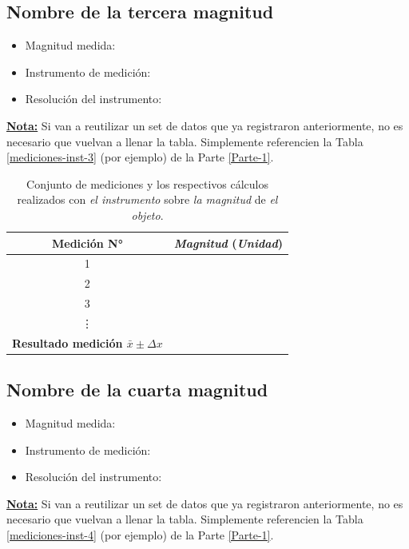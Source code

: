 \documentclass[12pt,a4paper]{article}
\begin{document}
\subsection{Nombre de la tercera magnitud}

\begin{itemize}
    \item Magnitud medida:
    \item Instrumento de medición:
    \item Resolución del instrumento:
\end{itemize}

\underline{\textbf{Nota:}} Si van a reutilizar un set de datos que ya registraron anteriormente, no es necesario que vuelvan a llenar la tabla. Simplemente referencien la Tabla \ref{mediciones-inst-3} (por ejemplo) de la Parte \ref{Parte-1}.

\begin{table}[h!]
\centering
\begin{tabular}{|c|c|}
\hline
\textbf{Medición N°} & \textit{Magnitud} \textbf{(}\textit{Unidad}\textbf{)} \\ \hline
1 & \\ \hline
2 & \\ \hline
3 & \\ \hline
\vdots & \\ \hline
\textbf{Resultado medición $\bar{x} \pm \Delta x$} & \\ \hline
\end{tabular}
\caption{Conjunto de mediciones y los respectivos cálculos realizados con \textit{el instrumento} sobre \textit{la magnitud} de \textit{el objeto}.}
\label{mediciones-magn-3}
\end{table}

\subsection{Nombre de la cuarta magnitud}

\begin{itemize}
    \item Magnitud medida:
    \item Instrumento de medición:
    \item Resolución del instrumento:
\end{itemize}

\underline{\textbf{Nota:}} Si van a reutilizar un set de datos que ya registraron anteriormente, no es necesario que vuelvan a llenar la tabla. Simplemente referencien la Tabla \ref{mediciones-inst-4} (por ejemplo) de la Parte \ref{Parte-1}.
\end{document}

